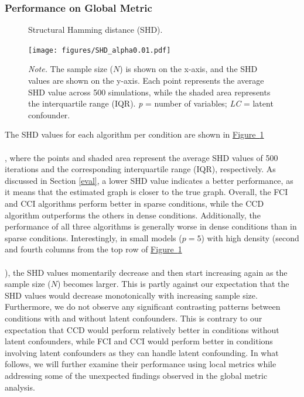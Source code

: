 \documentclass[twoside, 11pt]{article}
\newcommand*{\figref}[2][]{%
  \hyperref[{fig:#2}]{%
    Figure~\ref*{fig:#2}%
    \ifx\\#1\\%
    \else
      #1%
    \fi
  }%
}
\begin{document}
\subsubsection{Performance on Global Metric} \label{overallperformance}


\begin{figure}[!b]
\vspace{3mm}
    \centering
        \caption{Structural Hamming distance (SHD).}
        \vspace{1mm}
        \texttt{[image: figures/SHD\_alpha0.01.pdf]}
        \vspace*{-4mm}
        \caption*{\small{\textit{Note.} The sample size ($N$) is shown on the x-axis, and the SHD values are shown on the y-axis. Each point represents the average SHD value across 500 simulations, while the shaded area represents the interquartile range (IQR). \textit{p} = number of variables; \textit{LC} = latent confounder.}}
    \label{fig:13}
\end{figure}

The SHD values for each algorithm per condition are shown in \figref[]{13}, where the points and shaded area represent the average SHD values of 500 iterations and the corresponding interquartile range (IQR), respectively. As discussed in Section \ref{eval}, a lower SHD value indicates a better performance, as it means that the estimated graph is closer to the true graph. Overall, the FCI and CCI algorithms perform better in sparse conditions, while the CCD algorithm outperforms the others in dense conditions.
Additionally, the performance of all three algorithms is generally worse in dense conditions than in sparse conditions.
Interestingly, in small models ($p=5$) with high density (second and fourth columns from the top row of \figref[]{13}), the SHD values momentarily decrease and then start increasing again as the sample size ($N$) becomes larger. This is partly against our expectation that the SHD values would decrease monotonically with increasing sample size. Furthermore, we do not observe any significant contrasting patterns between conditions with and without latent confounders. This is contrary to our expectation that CCD would perform relatively better in conditions without latent confounders, while FCI and CCI would perform better in conditions involving latent confounders as they can handle latent confounding.
In what follows, we will further examine their performance using local metrics while addressing some of the unexpected findings observed in the global metric analysis.
\end{document}
